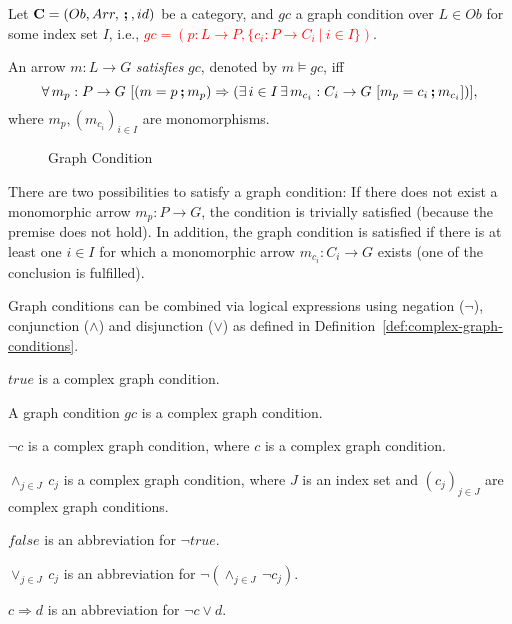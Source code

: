 \begin{definition}
	\label{def:satisfaction-of-graph-conditions}%
	Let $\mathbf{C} = (Ob, Arr, \textbf{\,;\,} , id)$ be a category, and $gc$ a graph condition over $L \in Ob$ for some index set $I$, i.e., \textcolor{red}{$gc = (p: L \rightarrow P, \{ c_i: P \rightarrow C_i ~|~ i \in I \})$}.

	\gap
	An arrow $m: L \rightarrow G$ \emph{satisfies} $gc$, denoted by $m \models gc$, iff\\ 
	\[
		\forall\, m_p: P \rightarrow G ~[(m = p \textbf{\,;\,} m_p) \Rightarrow (\exists\, i \in I\, \exists\, m_{c_i}: C_i \rightarrow G ~[m_p = c_i \textbf{\,;\,} m_{c_i}])],
	\]
	where $m_p, (m_{c_i})_{i \in I}$ are monomorphisms.
\end{definition}

\begin{figure}[h!]
	\centering
	
	\caption{Graph Condition}
	\label{fig:graph-condition}
\end{figure}

\noindent
There are two possibilities to satisfy a graph condition:
If there does not exist a monomorphic arrow $m_p: P \rightarrow G$, the condition is trivially satisfied (because the premise does not hold).
In addition, the graph condition is satisfied if there is at least one $i \in I$ for which a monomorphic arrow $m_{c_i}: C_i \rightarrow G$ exists (one of the conclusion is fulfilled).

Graph conditions can be combined via logical expressions using negation ($\neg$), conjunction ($\wedge$) and disjunction ($\vee$) as defined in Definition~\ref{def:complex-graph-conditions}.

\begin{definition}
	\label{def:complex-graph-conditions}
	$true$ is a complex graph condition.

	\gap
	A graph condition $gc$ is a complex graph condition.

	\gap
	$\neg c$ is a complex graph condition, where $c$ is a complex graph condition.

	\gap
	$\wedge_{j \in J}\, c_j$ is a complex graph condition, where $J$ is an index set and $(c_j)_{j \in J}$ are complex graph conditions.

	\gap
	$false$ is an abbreviation for $\neg true$.

	\gap
	$\vee_{j \in J}\, c_j$ is an abbreviation for $\neg (\wedge_{j \in J}\, \neg c_j)$.

	\gap
	$c \Rightarrow d$ is an abbreviation for $\neg c \vee d$.
\end{definition}


